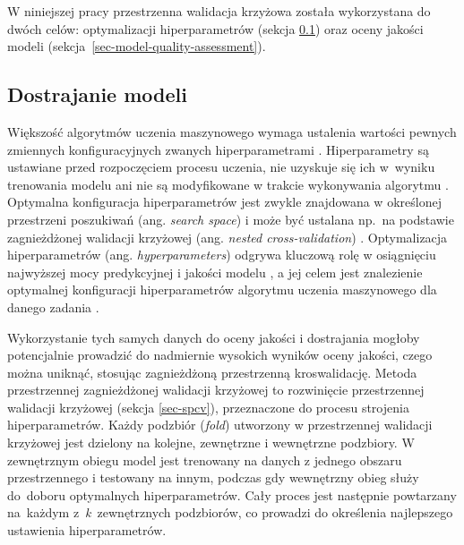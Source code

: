 \documentclass{amuthesis}
\begin{document}
W niniejszej pracy przestrzenna walidacja krzyżowa została wykorzystana
do dwóch celów: optymalizacji hiperparametrów (sekcja \ref{sec-tuning})
oraz oceny jakości modeli (sekcja~\ref{sec-model-quality-assessment}).

\hypertarget{sec-tuning}{%
\subsection{Dostrajanie modeli}\label{sec-tuning}}

Większość algorytmów uczenia maszynowego wymaga ustalenia wartości
pewnych zmiennych konfiguracyjnych zwanych hiperparametrami
\autocite{krol_2022_podstawy_ml}. Hiperparametry są ustawiane przed
rozpoczęciem procesu uczenia, nie uzyskuje się ich w~wyniku trenowania
modelu ani nie są modyfikowane w trakcie wykonywania algorytmu
\autocite{krol_2022_podstawy_ml}. Optymalna konfiguracja hiperparametrów
jest zwykle znajdowana w określonej przestrzeni poszukiwań (ang.
\emph{search space}) i może być ustalana np.~na podstawie zagnieżdżonej
walidacji krzyżowej (ang. \emph{nested cross-validation})
\autocite{lovelace_2019_geocomputation}. Optymalizacja hiperparametrów
(ang. \emph{hyperparameters}) odgrywa kluczową rolę w osiągnięciu
najwyższej mocy predykcyjnej i jakości modelu
\autocite{schratz_2019_hyperparameters}, a jej celem jest znalezienie
optymalnej konfiguracji hiperparametrów algorytmu uczenia maszynowego
dla danego zadania \autocite{bischl_2024_mlr3}.

Wykorzystanie tych samych danych do oceny jakości i dostrajania mogłoby
potencjalnie prowadzić do nadmiernie wysokich wyników oceny jakości,
czego można uniknąć, stosując zagnieżdżoną przestrzenną kroswalidację.
Metoda przestrzennej zagnieżdżonej walidacji krzyżowej to rozwinięcie
przestrzennej walidacji krzyżowej (sekcja \ref{sec-spcv}), przeznaczone
do procesu strojenia hiperparametrów. Każdy podzbiór (\emph{fold})
utworzony w przestrzennej walidacji krzyżowej jest dzielony na kolejne,
zewnętrzne i wewnętrzne podzbiory. W zewnętrznym obiegu model jest
trenowany na danych z jednego obszaru przestrzennego i testowany na
innym, podczas gdy wewnętrzny obieg służy do~doboru optymalnych
hiperparametrów. Cały proces jest następnie powtarzany na~każdym
z~\emph{k}~zewnętrznych podzbiorów, co prowadzi do określenia
najlepszego ustawienia hiperparametrów.
\end{document}
